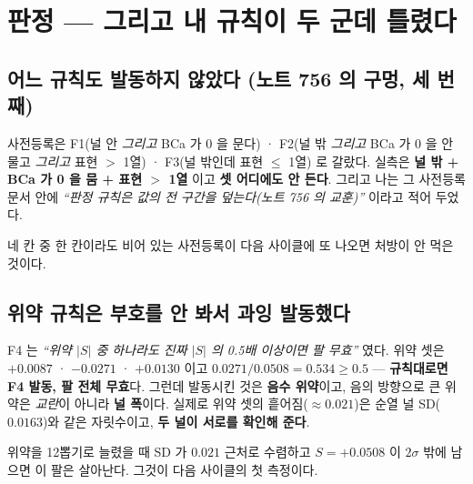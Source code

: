 \documentclass[10pt]{article}
\begin{document}
\section{판정 --- 그리고 내 규칙이 두 군데 틀렸다}

\subsection{어느 규칙도 발동하지 않았다 (노트 756 의 구멍, 세 번째)}

사전등록은 F1(널 안 \emph{그리고} BCa 가 0 을 문다) · F2(널 밖 \emph{그리고} BCa 가
0 을 안 물고 \emph{그리고} 표현 $>$ 1열) · F3(널 밖인데 표현 $\le$ 1열) 로 갈랐다.
실측은 \textbf{널 밖 + BCa 가 0 을 뭄 + 표현 $>$ 1열} 이고 \textbf{셋 어디에도
안 든다}. 그리고 나는 그 사전등록 문서 안에
\emph{``판정 규칙은 값의 전 구간을 덮는다(노트 756 의 교훈)''} 이라고 적어 두었다.

{네 칸 중 한 칸이라도 비어 있는 사전등록이 다음 사이클에 또 나오면 처방이 안 먹은
것이다.}

\subsection{위약 규칙은 부호를 안 봐서 과잉 발동했다}

F4 는 \emph{``위약 $|S|$ 중 하나라도 진짜 $|S|$ 의 0.5배 이상이면 팔 무효''} 였다.
위약 셋은 $+0.0087$ · $\mathbf{-0.0271}$ · $+0.0130$ 이고
$0.0271/0.0508 = \mathbf{0.534} \ge 0.5$ --- \textbf{규칙대로면 F4 발동, 팔 전체
무효}다. 그런데 발동시킨 것은 \textbf{음수 위약}이고, 음의 방향으로 큰 위약은
\emph{교란}이 아니라 \textbf{널 폭}이다. 실제로 위약 셋의 흩어짐($\approx0.021$)은
순열 널 SD($0.0163$)와 같은 자릿수이고, \textbf{두 널이 서로를 확인해 준다}.

{위약을 12뽑기로 늘렸을 때 SD 가 $0.021$ 근처로 수렴하고 $S=+0.0508$ 이
$2\sigma$ 밖에 남으면 이 팔은 살아난다. 그것이 다음 사이클의 첫 측정이다.}
\end{document}
